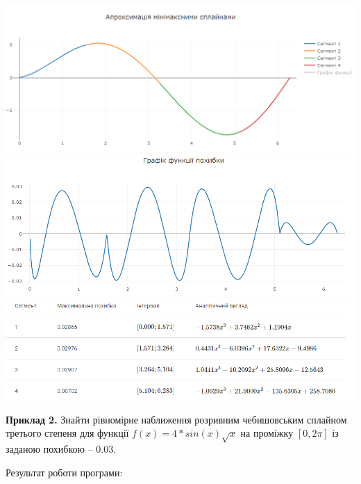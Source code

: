 \documentclass[ukrainian,14pt]{extarticle}
\begin{document}
\includegraphics[scale=0.65]{examples/1_approx.png}
\vspace{0.5cm}
\includegraphics[scale=0.65]{examples/1_error.png}
\vspace{0.5cm}
\includegraphics[scale=0.7]{examples/1_table.png}

\vspace{1cm}
\textbf{Приклад 2.} Знайти рівномірне наближення розривним чебишовським сплайном третього степеня для функції $f(x)=4*sin(x) \sqrt{x} $ на проміжку $[0, 2\pi]$ із заданою похибкою – $0.03$.

Результат роботи програми:
\end{document}
